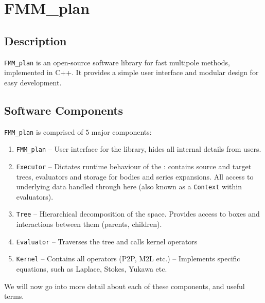 
\chapter{FMM\_plan}
\label{chapter:fmm_plan}
\thispagestyle{myheadings}

\section{Description}\label{sec:overview}

{\lstinline|FMM_plan|} is an open-source software library for fast multipole methods, implemented in C++. It provides a simple user interface and modular design for easy development. 

\section{Software Components}\label{sec:components}

{\lstinline|FMM_plan|} is comprised of $5$ major components:

\begin{enumerate}

\item {\lstinline|FMM_plan|} -- User interface for the library, hides all internal details from users.

\item {\lstinline|Executor|} -- Dictates runtime behaviour of the {\fmm}: contains source and target trees, evaluators and storage for bodies and series expansions. All access to underlying data handled through here (also known as a {\lstinline|Context|} within evaluators).

\item {\lstinline|Tree|} -- Hierarchical decomposition of the space. Provides access to boxes and interactions between them (parents, children).

\item {\lstinline|Evaluator|} -- Traverses the tree and calls kernel operators

\item {\lstinline|Kernel|} -- Contains all operators (P2P, M2L etc.) -- Implements specific equations, such as Laplace, Stokes, Yukawa etc.

\end{enumerate}

\noindent
We will now go into more detail about each of these components, and useful terms.

